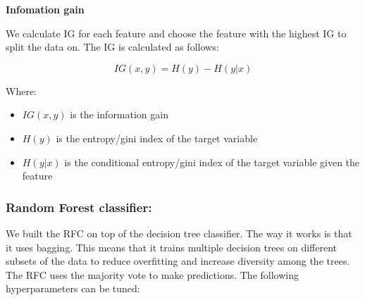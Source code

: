 \documentclass[11pt]{article}
\begin{document}
\textbf{Infomation gain}

We calculate IG for each feature and choose the feature with the highest
IG to split the data on. The IG is calculated as follows:

\[IG(x, y) = H(y) - H(y|x)\]

Where:

\begin{itemize}
\item
  \(IG(x, y)\) is the information gain
\item
  \(H(y)\) is the entropy/gini index of the target variable
\item
  \(H(y|x)\) is the conditional entropy/gini index of the target
  variable given the feature
\end{itemize}

    \subsubsection{Random Forest
classifier:}\label{random-forest-classifier}

We built the RFC on top of the decision tree classifier. The way it
works is that it uses bagging. This means that it trains multiple
decision trees on different subsets of the data to reduce overfitting
and increase diversity among the trees. The RFC uses the majority vote
to make predictions. The following hyperparameters can be tuned:
\end{document}
